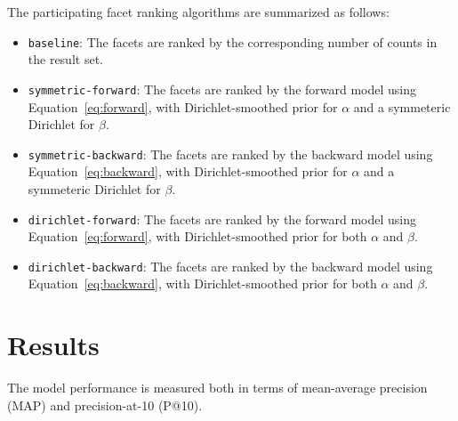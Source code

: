 The participating facet ranking algorithms are summarized as follows:
\begin{itemize}
  \item {\tt baseline}:  The facets are ranked by the corresponding number of counts in the result set.
  \item {\tt symmetric-forward}:  The facets are ranked by the forward model using Equation~\eqref{eq:forward}, with Dirichlet-smoothed prior for $\alpha$ and a symmeteric Dirichlet for $\beta$.
  \item {\tt symmetric-backward}:  The facets are ranked by the backward model using Equation~\eqref{eq:backward}, with Dirichlet-smoothed prior for $\alpha$ and a symmeteric Dirichlet for $\beta$.
  \item {\tt dirichlet-forward}:  The facets are ranked by the forward model using Equation~\eqref{eq:forward}, with Dirichlet-smoothed prior for both $\alpha$ and $\beta$.
  \item {\tt dirichlet-backward}:  The facets are ranked by the backward model using Equation~\eqref{eq:backward}, with Dirichlet-smoothed prior for both $\alpha$ and $\beta$.
\end{itemize}

\section{Results}


The model performance is measured both in terms of mean-average precision (MAP)
and precision-at-10 (P@10).  


